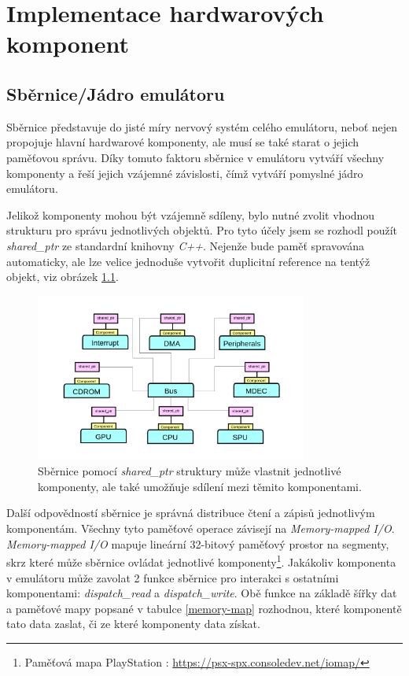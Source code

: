 \chapter{Implementace hardwarových komponent}

\section{Sběrnice/Jádro emulátoru}

Sběrnice představuje do jisté míry nervový systém celého emulátoru, neboť nejen propojuje hlavní 
hardwarové komponenty, ale musí se také starat o jejich paměťovou správu. 
Díky tomuto faktoru sběrnice v emulátoru vytváří všechny komponenty a řeší jejich vzájemné závislosti, čímž
vytváří pomyslné jádro emulátoru.

Jelikož komponenty mohou být vzájemně sdíleny, bylo nutné zvolit vhodnou 
strukturu pro správu jednotlivých objektů. Pro tyto účely jsem se rozhodl použít \textit{shared\_ptr} ze 
standardní knihovny \textit{C++}. Nejenže bude paměť spravována automaticky, ale lze velice jednoduše vytvořit duplicitní reference na tentýž objekt, viz obrázek \ref{bus-ownage}.

\begin{figure}[hbt]
    \centering
    \includegraphics[width=0.8\textwidth]{obrazky-figures/bus-ownage.png}
    \caption[Návrh sběrnice]{Sběrnice pomocí \textit{shared\_ptr} struktury může vlastnit jednotlivé komponenty, ale také umožňuje sdílení mezi těmito komponentami.}
    \label{bus-ownage}
\end{figure}

Další odpovědností sběrnice je správná distribuce čtení a zápisů jednotlivým komponentám. 
Všechny tyto paměťové operace závisejí na \textit{Memory-mapped I/O}. \textit{Memory-mapped I/O} mapuje 
lineární 32-bitový paměťový prostor na segmenty, skrz které může sběrnice ovládat jednotlivé komponenty\footnote{Paměťová mapa PlayStation \cite{PSXSpec}: \url{https://psx-spx.consoledev.net/iomap/}}.
Jakákoliv komponenta v emulátoru může zavolat 2 funkce sběrnice pro interakci s ostatními komponentami: \textit{dispatch\_read} a \textit{dispatch\_write}.
Obě funkce na základě šířky dat a paměťové mapy popsané v tabulce \ref{memory-map} rozhodnou, které komponentě tato data zaslat, či ze které komponenty data získat.

